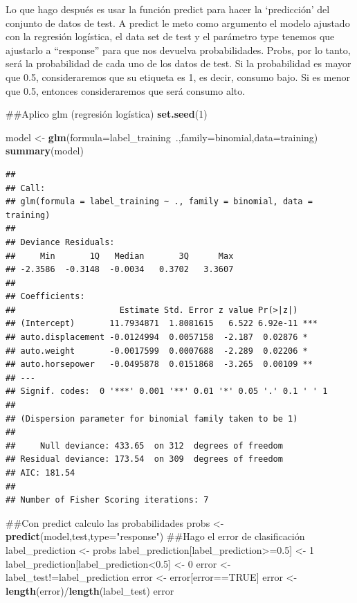 \documentclass[]{article}
\newenvironment{Shaded}{\begin{snugshade}}{\end{snugshade}}
\newcommand{\KeywordTok}[1]{\textcolor[rgb]{0.13,0.29,0.53}{\textbf{{#1}}}}
\newcommand{\DataTypeTok}[1]{\textcolor[rgb]{0.13,0.29,0.53}{{#1}}}
\newcommand{\DecValTok}[1]{\textcolor[rgb]{0.00,0.00,0.81}{{#1}}}
\newcommand{\FloatTok}[1]{\textcolor[rgb]{0.00,0.00,0.81}{{#1}}}
\newcommand{\StringTok}[1]{\textcolor[rgb]{0.31,0.60,0.02}{{#1}}}
\newcommand{\OtherTok}[1]{\textcolor[rgb]{0.56,0.35,0.01}{{#1}}}
\newcommand{\NormalTok}[1]{{#1}}
\begin{document}
Lo que hago después es usar la función predict para hacer la
`predicción' del conjunto de datos de test. A predict le meto como
argumento el modelo ajustado con la regresión logística, el data set de
test y el parámetro type tenemos que ajustarlo a ``response'' para que
nos devuelva probabilidades. Probs, por lo tanto, será la probabilidad
de cada uno de los datos de test. Si la probabilidad es mayor que 0.5,
consideraremos que su etiqueta es 1, es decir, consumo bajo. Si es menor
que 0.5, entonces consideraremos que será consumo alto.

\begin{Shaded}
\begin{Highlighting}[]
\NormalTok{##Aplico glm (regresión logística)}
\KeywordTok{set.seed}\NormalTok{(}\DecValTok{1}\NormalTok{)}

\NormalTok{model <-}\StringTok{ }\KeywordTok{glm}\NormalTok{(}\DataTypeTok{formula=}\NormalTok{label_training~.,}\DataTypeTok{family=}\NormalTok{binomial,}\DataTypeTok{data=}\NormalTok{training)}
\KeywordTok{summary}\NormalTok{(model)}
\end{Highlighting}
\end{Shaded}

\begin{verbatim}
## 
## Call:
## glm(formula = label_training ~ ., family = binomial, data = training)
## 
## Deviance Residuals: 
##     Min       1Q   Median       3Q      Max  
## -2.3586  -0.3148  -0.0034   0.3702   3.3607  
## 
## Coefficients:
##                     Estimate Std. Error z value Pr(>|z|)    
## (Intercept)       11.7934871  1.8081615   6.522 6.92e-11 ***
## auto.displacement -0.0124994  0.0057158  -2.187  0.02876 *  
## auto.weight       -0.0017599  0.0007688  -2.289  0.02206 *  
## auto.horsepower   -0.0495878  0.0151868  -3.265  0.00109 ** 
## ---
## Signif. codes:  0 '***' 0.001 '**' 0.01 '*' 0.05 '.' 0.1 ' ' 1
## 
## (Dispersion parameter for binomial family taken to be 1)
## 
##     Null deviance: 433.65  on 312  degrees of freedom
## Residual deviance: 173.54  on 309  degrees of freedom
## AIC: 181.54
## 
## Number of Fisher Scoring iterations: 7
\end{verbatim}

\begin{Shaded}
\begin{Highlighting}[]
\NormalTok{##Con predict calculo las probabilidades}
\NormalTok{probs <-}\StringTok{ }\KeywordTok{predict}\NormalTok{(model,test,}\DataTypeTok{type=}\StringTok{"response"}\NormalTok{)}
\NormalTok{##Hago el error de clasificación}
\NormalTok{label_prediction <-}\StringTok{ }\NormalTok{probs}
\NormalTok{label_prediction[label_prediction>=}\FloatTok{0.5}\NormalTok{] <-}\StringTok{ }\DecValTok{1}
\NormalTok{label_prediction[label_prediction<}\FloatTok{0.5}\NormalTok{] <-}\StringTok{ }\DecValTok{0}
\NormalTok{error <-}\StringTok{ }\NormalTok{label_test!=label_prediction}
\NormalTok{error <-}\StringTok{ }\NormalTok{error[error==}\OtherTok{TRUE}\NormalTok{]}
\NormalTok{error <-}\StringTok{ }\KeywordTok{length}\NormalTok{(error)/}\KeywordTok{length}\NormalTok{(label_test)}
\NormalTok{error}
\end{Highlighting}
\end{Shaded}
\end{document}
